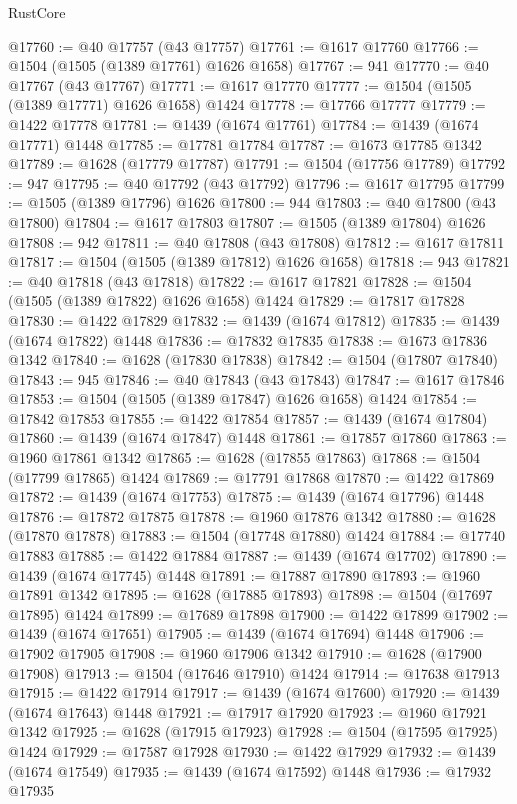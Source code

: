 \begin{lexlean}{RustCore}
\begin{coremodule}
@17760 := @40 @17757 (@43 @17757)
@17761 := @1617 @17760
@17766 := @1504 (@1505 (@1389 @17761) @1626 @1658)
@17767 := 941
@17770 := @40 @17767 (@43 @17767)
@17771 := @1617 @17770
@17777 := @1504 (@1505 (@1389 @17771) @1626 @1658) @1424
@17778 := @17766 @17777
@17779 := @1422 @17778
@17781 := @1439 (@1674 @17761)
@17784 := @1439 (@1674 @17771) @1448
@17785 := @17781 @17784
@17787 := @1673 @17785 @1342
@17789 := @1628 (@17779 @17787)
@17791 := @1504 (@17756 @17789)
@17792 := 947
@17795 := @40 @17792 (@43 @17792)
@17796 := @1617 @17795
@17799 := @1505 (@1389 @17796) @1626
@17800 := 944
@17803 := @40 @17800 (@43 @17800)
@17804 := @1617 @17803
@17807 := @1505 (@1389 @17804) @1626
@17808 := 942
@17811 := @40 @17808 (@43 @17808)
@17812 := @1617 @17811
@17817 := @1504 (@1505 (@1389 @17812) @1626 @1658)
@17818 := 943
@17821 := @40 @17818 (@43 @17818)
@17822 := @1617 @17821
@17828 := @1504 (@1505 (@1389 @17822) @1626 @1658) @1424
@17829 := @17817 @17828
@17830 := @1422 @17829
@17832 := @1439 (@1674 @17812)
@17835 := @1439 (@1674 @17822) @1448
@17836 := @17832 @17835
@17838 := @1673 @17836 @1342
@17840 := @1628 (@17830 @17838)
@17842 := @1504 (@17807 @17840)
@17843 := 945
@17846 := @40 @17843 (@43 @17843)
@17847 := @1617 @17846
@17853 := @1504 (@1505 (@1389 @17847) @1626 @1658) @1424
@17854 := @17842 @17853
@17855 := @1422 @17854
@17857 := @1439 (@1674 @17804)
@17860 := @1439 (@1674 @17847) @1448
@17861 := @17857 @17860
@17863 := @1960 @17861 @1342
@17865 := @1628 (@17855 @17863)
@17868 := @1504 (@17799 @17865) @1424
@17869 := @17791 @17868
@17870 := @1422 @17869
@17872 := @1439 (@1674 @17753)
@17875 := @1439 (@1674 @17796) @1448
@17876 := @17872 @17875
@17878 := @1960 @17876 @1342
@17880 := @1628 (@17870 @17878)
@17883 := @1504 (@17748 @17880) @1424
@17884 := @17740 @17883
@17885 := @1422 @17884
@17887 := @1439 (@1674 @17702)
@17890 := @1439 (@1674 @17745) @1448
@17891 := @17887 @17890
@17893 := @1960 @17891 @1342
@17895 := @1628 (@17885 @17893)
@17898 := @1504 (@17697 @17895) @1424
@17899 := @17689 @17898
@17900 := @1422 @17899
@17902 := @1439 (@1674 @17651)
@17905 := @1439 (@1674 @17694) @1448
@17906 := @17902 @17905
@17908 := @1960 @17906 @1342
@17910 := @1628 (@17900 @17908)
@17913 := @1504 (@17646 @17910) @1424
@17914 := @17638 @17913
@17915 := @1422 @17914
@17917 := @1439 (@1674 @17600)
@17920 := @1439 (@1674 @17643) @1448
@17921 := @17917 @17920
@17923 := @1960 @17921 @1342
@17925 := @1628 (@17915 @17923)
@17928 := @1504 (@17595 @17925) @1424
@17929 := @17587 @17928
@17930 := @1422 @17929
@17932 := @1439 (@1674 @17549)
@17935 := @1439 (@1674 @17592) @1448
@17936 := @17932 @17935

\end{coremodule}
\end{lexlean}
